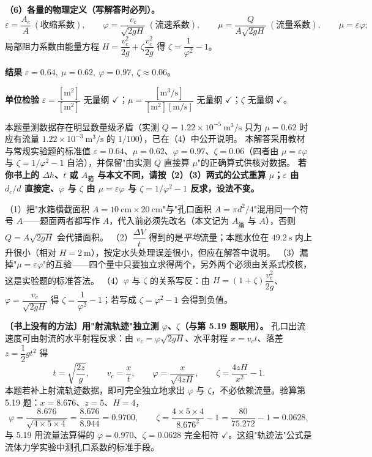 \begin{jie}
\textbf{（6）各量的物理定义（写解答时必列）。}
\[\varepsilon=\frac{A_c}{A}\ (\text{收缩系数}),\qquad
\varphi=\frac{v_c}{\sqrt{2gH}}\ (\text{流速系数}),\qquad
\mu=\frac{Q}{A\sqrt{2gH}}\ (\text{流量系数}),\qquad
\mu=\varepsilon\varphi;\]
局部阻力系数由能量方程 $H=\dfrac{v_c^2}{2g}+\zeta\dfrac{v_c^2}{2g}$ 得 $\zeta=\dfrac{1}{\varphi^2}-1$。

\textbf{结果} $\boxed{\varepsilon=0.64,\ \mu=0.62,\ \varphi=0.97,\ \zeta\approx0.06}$。

\textbf{单位检验} $\varepsilon=\dfrac{[\mathrm{m^2}]}{[\mathrm{m^2}]}$ 无量纲 $\checkmark$；$\mu=\dfrac{[\mathrm{m^3/s}]}{[\mathrm{m^2}][\mathrm{m/s}]}$ 无量纲 $\checkmark$；$\zeta$ 无量纲 $\checkmark$。
\end{jie}
\begin{tishi}
本题量测数据存在明显数量级矛盾（实测 $Q=1.22\times10^{-5}\ \mathrm{m^3/s}$ 只为 $\mu=0.62$ 时应有流量 $1.22\times10^{-3}\ \mathrm{m^3/s}$ 的 $1/100$），已在（4）中公开说明。
本解答采用教材与常规实验题的标准值 $\varepsilon=0.64$、$\mu=0.62$、$\varphi=0.97$、$\zeta=0.06$（四者由 $\mu=\varepsilon\varphi$ 与 $\zeta=1/\varphi^2-1$ 自洽），并保留"由实测 $Q$ 直接算 $\mu$"的正确算式供核对数据。
\textbf{若你书上的 $\Delta h$、$t$ 或 $A_{\text{箱}}$ 与本文不同，请按（2）（3）两式的公式重算 $\mu$；$\varepsilon$ 由 $d_c/d$ 直接定、$\varphi$ 与 $\zeta$ 由 $\mu=\varepsilon\varphi$ 与 $\zeta=1/\varphi^2-1$ 反求，设法不变。}
\end{tishi}
\begin{yicuo}
（1）把"水箱横截面积 $A=10\ \mathrm{cm}\times20\ \mathrm{cm}$"与"孔口面积 $A=\pi d^2/4$"混用同一个符号 $A$——题面两者都写作 $A$，代入前必须先改名（本文记为 $A_{\text{箱}}$ 与 $A$），否则 $Q=A\sqrt{2gH}$ 会代错面积。
（2）$\dfrac{\Delta V}{t}$ 得到的是\emph{平均}流量；本题水位在 $49.2\ \mathrm{s}$ 内上升很小（相对 $H=2\ \mathrm{m}$），按定水头处理误差很小，但应在解答中说明。
（3）漏掉"$\mu=\varepsilon\varphi$"的互验——四个量中只要独立求得两个，另外两个必须由关系式校核，这是实验题的标准答法。
（4）$\varphi$ 与 $\zeta$ 的关系写反：由 $H=(1+\zeta)\dfrac{v_c^2}{2g}$、$\varphi=\dfrac{v_c}{\sqrt{2gH}}$ 得 $\zeta=\dfrac{1}{\varphi^2}-1$；若写成 $\zeta=\varphi^2-1$ 会得到负值。
\end{yicuo}
\begin{banfa}
\textbf{〔书上没有的方法〕用"射流轨迹"独立测 $\varphi$、$\zeta$（与第 5.19 题联用）。} 孔口出流速度可由射流的水平射程反求：由 $v_c=\varphi\sqrt{2gH}$、水平射程 $x=v_ct$、落差 $z=\dfrac12gt^2$ 得
\[t=\sqrt{\frac{2z}{g}},\qquad v_c=\frac{x}{t},\qquad
\varphi=\frac{x}{\sqrt{4zH}},\qquad \zeta=\frac{4zH}{x^2}-1.\]
本题若补上射流轨迹数据，即可完全独立地求出 $\varphi$ 与 $\zeta$，不必依赖流量。验算第 5.19 题：$x=8.676$、$z=5$、$H=4$，
\[\varphi=\frac{8.676}{\sqrt{4\times5\times4}}=\frac{8.676}{8.944}=0.9700,\qquad
\zeta=\frac{4\times5\times4}{8.676^2}-1=\frac{80}{75.272}-1=0.0628,\]
与 5.19 用流量法算得的 $\varphi=0.970$、$\zeta=0.0628$ 完全相符 $\checkmark$。这组"轨迹法"公式是流体力学实验中测孔口系数的标准手段。
\end{banfa}

